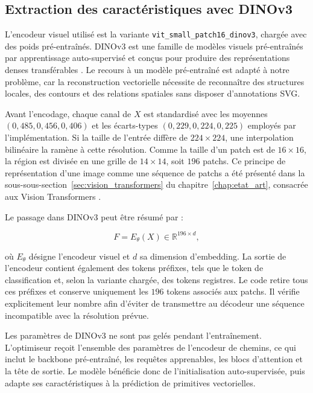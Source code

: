\documentclass[12pt, a4paper, oneside]{report}
\begin{document}
\subsection{Extraction des caractéristiques avec DINOv3}

L'encodeur visuel utilisé est la variante \texttt{vit\_small\_patch16\_dinov3}, chargée avec des poids pré-entraînés. DINOv3 est une famille de modèles visuels pré-entraînés par apprentissage auto-supervisé et conçus pour produire des représentations denses transférables \cite{simeoni2025dinov3}. Le recours à un modèle pré-entraîné est adapté à notre problème, car la reconstruction vectorielle nécessite de reconnaître des structures locales, des contours et des relations spatiales sans disposer d'annotations SVG.

Avant l'encodage, chaque canal de $X$ est standardisé avec les moyennes $(0{,}485,0{,}456,0{,}406)$ et les écarts-types $(0{,}229,0{,}224,0{,}225)$ employés par l'implémentation. Si la taille de l'entrée diffère de $224 \times 224$, une interpolation bilinéaire la ramène à cette résolution. Comme la taille d'un patch est de $16 \times 16$, la région est divisée en une grille de $14 \times 14$, soit $196$ patchs. Ce principe de représentation d'une image comme une séquence de patchs a été présenté dans la sous-sous-section~\ref{sec:vision_transformers} du chapitre~\ref{chap:etat_art}, consacrée aux Vision Transformers \cite{dosovitskiy2021image}.

Le passage dans DINOv3 peut être résumé par :

\begin{equation}
    F = E_{\theta}(X) \in \mathbb{R}^{196 \times d},
    \label{eq:features_dinov3}
\end{equation}

où $E_{\theta}$ désigne l'encodeur visuel et $d$ sa dimension d'embedding. La sortie de l'encodeur contient également des tokens préfixes, tels que le token de classification et, selon la variante chargée, des tokens registres. Le code retire tous ces préfixes et conserve uniquement les $196$ tokens associés aux patchs. Il vérifie explicitement leur nombre afin d'éviter de transmettre au décodeur une séquence incompatible avec la résolution prévue.

Les paramètres de DINOv3 ne sont pas gelés pendant l'entraînement. L'optimiseur reçoit l'ensemble des paramètres de l'encodeur de chemins, ce qui inclut le backbone pré-entraîné, les requêtes apprenables, les blocs d'attention et la tête de sortie. Le modèle bénéficie donc de l'initialisation auto-supervisée, puis adapte ses caractéristiques à la prédiction de primitives vectorielles.
\end{document}
